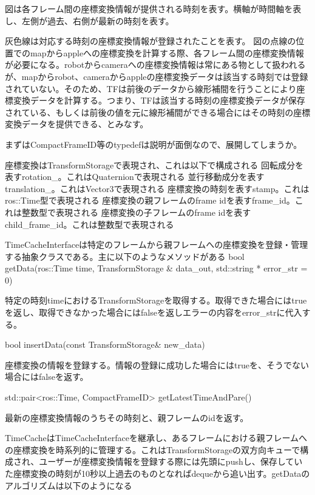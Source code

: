 \documentclass{article}
\begin{document}
\begin{multicols}{2}

図は各フレーム間の座標変換情報が提供される時刻を表す。横軸が時間軸を表し、左側が過去、右側が最新の時刻を表す。

灰色線は対応する時刻の座標変換情報が登録されたことを表す。
図の点線の位置でのmapからappleへの座標変換を計算する際、各フレーム間の座標変換情報が必要になる。robotからcameraへの座標変換情報は常にある物として扱われるが、mapからrobot、cameraからappleの座標変換データは該当する時刻では登録されていない。そのため、TFは前後のデータから線形補間を行うことにより座標変換データを計算する。つまり、TFは該当する時刻の座標変換データが保存されている、もしくは前後の値を元に線形補間ができる場合にはその時刻の座標変換データを提供できる、とみなす。





まずはCompactFrameID等のtypedefは説明が面倒なので、展開してしまうか。


座標変換はTransformStorageで表現され、これは以下で構成される
回転成分を表すrotation\_。これはQuaternionで表現される
並行移動成分を表すtranslation\_。これはVector3で表現される
座標変換の時刻を表すstamp。これはros::Time型で表現される
座標変換の親フレームのframe idを表すframe\_id。これは整数型で表現される
座標変換の子フレームのframe idを表すchild\_frame\_id。これは整数型で表現される

TimeCacheInterfaceは特定のフレームから親フレームへの座標変換を登録・管理する抽象クラスである。主に以下のようなメソッドがある
bool getData(ros::Time time, TransformStorage \& data\_out, std::string * error\_str = 0)

特定の時刻timeにおけるTransformStorageを取得する。取得できた場合にはtrueを返し、取得できなかった場合にはfalseを返しエラーの内容をerror\_strに代入する。

bool insertData(const TransformStorage\& new\_data)

座標変換の情報を登録する。情報の登録に成功した場合にはtrueを、そうでない場合にはfalseを返す。

std::pair<ros::Time, CompactFrameID> getLatestTimeAndPare()

最新の座標変換情報のうちその時刻と、親フレームのidを返す。


TimeCacheはTimeCacheInterfaceを継承し、あるフレームにおける親フレームへの座標変換を時系列的に管理する。これはTransformStorageの双方向キューで構成され、ユーザーが座標変換情報を登録する際には先頭にpushし、保存していた座標変換の時刻が10秒以上過去のものとなればdequeから追い出す。getDataのアルゴリズムは以下のようになる



\end{multicols}
\end{document}
